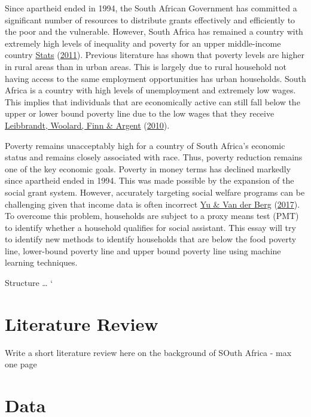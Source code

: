 \documentclass[11pt,preprint, authoryear]{elsarticle}
\numberwithin{equation}{section}
\numberwithin{figure}{section}
\numberwithin{table}{section}
\begin{document}
Since apartheid ended in 1994, the South African Government has
committed a significant number of resources to distribute grants
effectively and efficiently to the poor and the vulnerable. However,
South Africa has remained a country with extremely high levels of
inequality and poverty for an upper middle-income country
\protect\hyperlink{ref-stats2011social}{Stats}
(\protect\hyperlink{ref-stats2011social}{2011}). Previous literature has
shown that poverty levels are higher in rural areas than in urban areas.
This is largely due to rural household not having access to the same
employment opportunities has urban households. South Africa is a country
with high levels of unemployment and extremely low wages. This implies
that individuals that are economically active can still fall below the
upper or lower bound poverty line due to the low wages that they receive
\protect\hyperlink{ref-leibbrandt2010trends}{Leibbrandt, Woolard, Finn
\& Argent} (\protect\hyperlink{ref-leibbrandt2010trends}{2010}).

Poverty remains unacceptably high for a country of South Africa's
economic status and remains closely associated with race. Thus, poverty
reduction remains one of the key economic goals. Poverty in money terms
has declined markedly since apartheid ended in 1994. This was made
possible by the expansion of the social grant system. However,
accurately targeting social welfare programs can be challenging given
that income data is often incorrect
\protect\hyperlink{ref-vanderberg2017}{Yu \& Van der Berg}
(\protect\hyperlink{ref-vanderberg2017}{2017}). To overcome this
problem, households are subject to a proxy means test (PMT) to identify
whether a household qualifies for social assistant. This essay will try
to identify new methods to identify households that are below the food
poverty line, lower-bound poverty line and upper bound poverty line
using machine learning techniques.

Structure \ldots{} `

\hypertarget{literature-review}{%
\section{Literature Review}\label{literature-review}}

Write a short literature review here on the background of SOuth Africa -
max one page

\hypertarget{data}{%
\section{Data}\label{data}}
\end{document}
